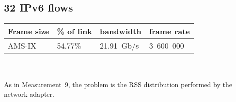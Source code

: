 
\subsection{32 IPv6 flows}
\begin{tabular}{ | l | l | l | l | }
\hline
Frame size & \% of link & bandwidth & frame rate \\
\hline
AMS-IX & 54.77\% & 21.91~Gb/s & 3~600~000 \\
\hline
\end{tabular}
\\
\\
As in Measurement~9, the problem is the RSS distribution performed by the network adapter.
